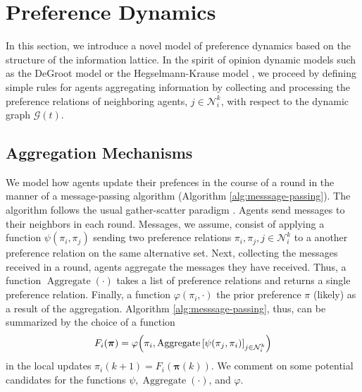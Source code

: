 \documentclass[conference]{ieeeconf}
\newcommand{\N}{\mathcal{N}}
\newcommand{\graph}{\mathcal{G}}
\DeclareMathOperator{\Aggregate}{Aggregate}
\begin{document}
\section{Preference Dynamics}

In this section, we introduce a novel model of preference dynamics based on the structure of the information lattice. In the spirit of opinion dynamic models such as the DeGroot model \cite{degroot1974} or the Hegselmann-Krause model \cite{hegselmann2002}, we proceed by defining simple rules for agents aggregating information by collecting and processing the preference relations of neighboring agents, $j \in \N_i^k$, with respect to the dynamic graph $\graph(t)$.

\subsection{Aggregation Mechanisms}

We model how agents update their prefences in the course of a round in the manner of a message-passing algorithm (Algorithm \ref{alg:messsage-passing}). The algorithm follows the usual gather-scatter paradigm \cite{dudzik}. Agents send messages to their neighbors in each round. Messages, we assume, consist of applying a function $\psi(\pi_i,\pi_j)$ sending two preference relations $\pi_i, \pi_j, j \in \N_i^k$ to a another preference relation on the same alternative set.
Next, collecting the messages received in a round, agents aggregate the messages they have received. Thus, a function $\Aggregate(\cdot)$ takes a list of preference relations and returns a single preference relation. Finally, a function $\varphi(\pi_i,\cdot)$ the prior preference $\pi$ (likely) as a result of the aggregation. Algorithm \ref{alg:messsage-passing}, thus, can be summarized by the choice of a function
\begin{align}
    F_i(\boldsymbol{\pi}) = \varphi\Bigl(\pi_i, \Aggregate{\left[ \psi(\pi_j, \pi_i)\right]_{j \in \N_i^k}} \Bigr)
\end{align}
in the local updates $\pi_i(k+1) = F_i\left( \boldsymbol{\pi}(k) \right)$. We comment on some potential candidates for the functions $\psi, \Aggregate(\cdot)$, and $\varphi$.
\end{document}
